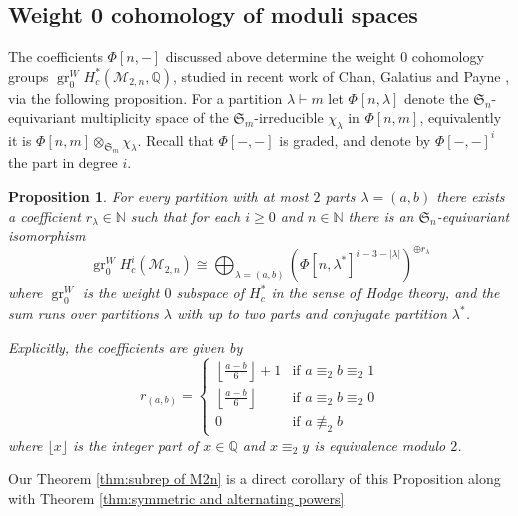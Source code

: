 \documentclass[12pt]{article}
\newcommand{\N}{\mathbb{N}}
\newcommand{\Q}{\mathbb{Q}}
\newcommand{\SymGroup}[1][n]{\mathfrak{S}_{#1}}
\newcommand{\Specht}[1]{\chi_{#1}}
\newcommand{\TransposePartition}[1]{{#1}^{\ast}}
\newcommand{\ModuliCurve}[1]{\mathcal{M}_{#1}}
\DeclareMathOperator{\gr}{gr}
\theoremstyle{plain}
\newtheorem{prop}[thm]{Proposition}
\theoremstyle{definition}
\theoremstyle{remark}
\begin{document}
\subsection{Weight 0 cohomology of moduli spaces}\label{sec:intro-M2n}

The coefficients $\Phi[n,-]$ discussed above determine the weight $0$ cohomology groups $\gr_0^{W} H_c^{*}(\ModuliCurve{2,n}, \Q)$, studied in recent work of Chan, Galatius and Payne \cite{CGP22,CFGP}, via the following proposition. For a partition $\lambda \vdash m$ let $\Phi[n,\lambda]$ denote the $\SymGroup$-equivariant multiplicity space of the $\SymGroup[m]$-irreducible $\Specht{\lambda}$ in $\Phi[n,m]$, equivalently it is $ \Phi[n,m]\otimes_{\SymGroup[m]}\Specht{\lambda}$. Recall that $\Phi[-,-]$ is graded, and denote by $\Phi[-,-]^i$ the part in degree $i$.

\begin{prop}\label{prop:cohom-moduli-space}
    For every partition with at most $2$ parts $\lambda = (a, b)$ there exists a coefficient $r_{\lambda} \in \N$ such that for each $i\geq 0$ and $n \in \N$ there is an $\SymGroup$-equivariant isomorphism
    \begin{equation} \label{eq:decomposition of moduli spaces}
        \gr_0^{W}H_c^{i}(\ModuliCurve{2,n}) \cong \bigoplus_{\lambda = (a, b)}\left(\Phi[n,\TransposePartition{\lambda}]^{i-3-|\lambda|}\right)^{\oplus r_\lambda}
    \end{equation}
    where $\gr^W_0$ is the weight $0$ subspace of $H^*_c$ in the sense of Hodge theory, and the sum runs over partitions $\lambda$ with up to two parts and conjugate partition $\TransposePartition{\lambda}$.
    
    Explicitly, the coefficients are given by
    \begin{equation}
        r_{(a,b)} = \begin{cases}
        \left\lfloor \frac{a-b}{6} \right\rfloor +1 & \text{if }a\equiv_2 b \equiv_2 1 \\
        \left\lfloor \frac{a-b}{6} \right\rfloor & \text{if }a\equiv_2 b \equiv_2 0 \\
        0 & \text{if }a\not\equiv_2 b 
        \end{cases}
    \end{equation}
    where $\lfloor x \rfloor$ is the integer part of $x\in \Q$ and $x\equiv_2 y$ is equivalence modulo $2$.
\end{prop}
Our Theorem \ref{thm:subrep of M2n} is a direct corollary of this Proposition along with Theorem \ref{thm:symmetric and alternating powers}
\end{document}
